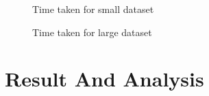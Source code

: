 \documentclass[9pt,twocolumn,twoside]{../../styles/osajnl}
\begin{document}
\begin{figure}[htbp]
\centering
{}
\caption{Time taken for small dataset} 
\label{fig:figure2}
\end{figure}


\begin{figure}[htbp]
\centering
{}
\caption{Time taken for large dataset} 
\label{fig:figure3}
\end{figure}

\section {Result And Analysis}
\end{document}

